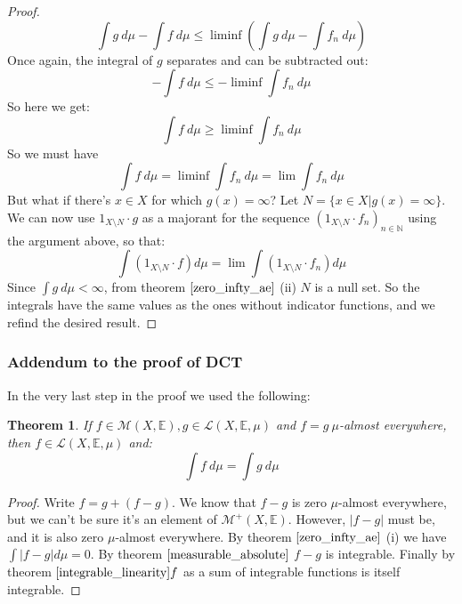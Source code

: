 \documentclass[12pt, a4paper]{article}
\newtheorem{theorem}{Theorem}[section]
\numberwithin{equation}{section}
\begin{document}
\begin{proof}
\begin{equation}
\int g\ d\mu - \int f\ d\mu\le\liminf\left(\int g\ d\mu - \int f_n\ d\mu\right)
\end{equation}
Once again, the integral of $g$ separates and can be subtracted out:
\begin{equation}
-\int f\ d\mu\le-\liminf\int f_n\ d\mu
\end{equation}
So here we get:
\begin{equation}
\int f\ d\mu\ge\liminf\int f_n\ d\mu
\end{equation}
So we must have 
\begin{equation}
\int f\ d\mu=\liminf\int f_n\ d\mu=\lim\int f_n\ d\mu
\end{equation}
But what if there's $x\in X$ for which $g(x)=\infty$? Let $N=\{x\in X|g(x)=\infty\}$. We can now use $1_{X\setminus N}\cdot g$ as a majorant for the sequence $(1_{X\setminus N}\cdot f_n)_{n\in\mathbb{N}}$ using the argument above, so that:
\begin{equation}
\int (1_{X\setminus N}\cdot f)d\mu=\lim\int(1_{X\setminus N}\cdot f_n)d\mu
\end{equation}
Since $\int g\ d\mu<\infty$, from theorem $\ref{zero_infty_ae}$ (ii) $N$ is a null set. So the integrals have the same values as the ones without indicator functions, and we refind the desired result. 
\end{proof}

\subsubsection{Addendum to the proof of DCT}
In the very last step in the proof we used the following:

\begin{theorem}
If $f\in\mathcal{M}(X,\mathbb{E}), g\in\mathcal{L}(X,\mathbb{E},\mu)$ and $f=g \ \mu$-almost everywhere, then $f\in\mathcal{L}(X,\mathbb{E},\mu)$ and:
\begin{equation}
\int f\ d\mu=\int g\ d\mu
\end{equation}
\end{theorem}
\begin{proof}
Write $f=g+(f-g)$. We know that $f-g$ is zero $\mu$-almost everywhere, but we can't be sure it's an element of $\mathcal{M}^+(X,\mathbb{E})$. However, $|f-g|$ must be, and it is also zero $\mu$-almost everywhere. By theorem $\ref{zero_infty_ae}$ (i) we have $\int|f-g|d\mu=0$. By theorem $\ref{measurable_absolute}$ $f-g$ is integrable. Finally by theorem $\ref{integrable_linearity} f$ as a sum of integrable functions is itself integrable.
\end{proof}
\end{document}
